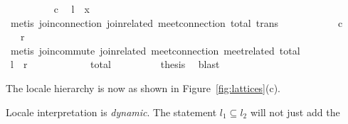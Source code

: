 \begin{isabellebody}
\ \ \ \ \ \ \ \ \isamarkupfalse%
\ c\ \isamarkupfalse%
\ {}{}l\ {}\ x{}\isanewline
\ \ \ \ \ \ \ \ \ \ \isamarkupfalse%
\ {}metis\ join{}connection{}\ join{}related{}\ meet{}connection\ total\ trans{}\isanewline
\ \ \ \ \ \ \ \ \isamarkupfalse%
\ \isamarkupfalse%
\ c\ \isamarkupfalse%
\ {}{}{}{}\ {}\ {}r{}\isanewline
\ \ \ \ \ \ \ \ \ \ \isamarkupfalse%
\ {}metis\ join{}commute\ join{}related{}\ meet{}connection\ meet{}related{}\ total{}\isanewline
\ \ \ \ \ \ \ \ \isamarkupfalse%
\ \isamarkupfalse%
\ {}{}l\ {}\ {}r{}\ \isamarkupfalse%
\ \isamarkupfalse%
\isanewline
\ \ \ \ \ \ \isamarkupfalse%
\ \isamarkupfalse%
\ total\isanewline
\ \ \ \ \ \ \isamarkupfalse%
\ \isamarkupfalse%
\ {}thesis\ \isamarkupfalse%
\ blast\isanewline
\ \ \ \ \isamarkupfalse%
\isanewline
\ \ \isamarkupfalse%
%
\endisatagproof
{\isafoldproof}%
%
\isadelimproof
%
\endisadelimproof
%
\begin{isamarkuptext}%
The locale hierarchy is now as shown in
  Figure~\ref{fig:lattices}(c).%
\end{isamarkuptext}%
\isamarkuptrue%
%
\begin{isamarkuptext}%
Locale interpretation is \emph{dynamic}.  The statement
   $l_1 \subseteq l_2$ will not just add the

\end{isamarkuptext}
\end{isabellebody}
